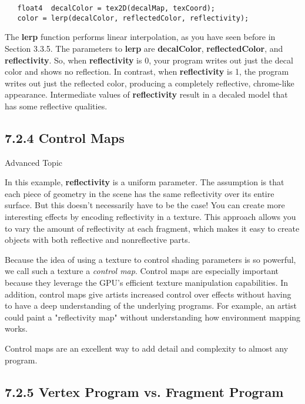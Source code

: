 \documentclass[../main.tex]{subfiles}
\begin{document}
\FloatBarrier
\begin{lstlisting}
   float4  decalColor = tex2D(decalMap, texCoord);
   color = lerp(decalColor, reflectedColor, reflectivity);
\end{lstlisting}
\FloatBarrier
   
The \textbf{lerp} function performs linear interpolation, as you have seen before in Section 3.3.5. The parameters to \textbf{lerp} are \textbf{decalColor}, \textbf{reflectedColor}, and \textbf{reflectivity}. So, when \textbf{reflectivity} is 0, your program writes out just the decal color and shows no reflection. In contrast, when \textbf{reflectivity} is 1, the program writes out just the reflected color, producing a completely reflective, chrome-like appearance. Intermediate values of \textbf{reflectivity} result in a decaled model that has some reflective qualities.

\subsection{7.2.4 Control Maps}

\begin{framed}
Advanced Topic

In this example, \textbf{reflectivity} is a uniform parameter. The assumption is that each piece of geometry in the scene has the same reflectivity over its entire surface. But this doesn't necessarily have to be the case! You can create more interesting effects by encoding reflectivity in a texture. This approach allows you to vary the amount of reflectivity at each fragment, which makes it easy to create objects with both reflective and nonreflective parts.

Because the idea of using a texture to control shading parameters is so powerful, we call such a texture a \textit{control map}. Control maps are especially important because they leverage the GPU's efficient texture manipulation capabilities. In addition, control maps give artists increased control over effects without having to have a deep understanding of the underlying programs. For example, an artist could paint a "reflectivity map" without understanding how environment mapping works.

Control maps are an excellent way to add detail and complexity to almost any program.
\end{framed}

\subsection{7.2.5 Vertex Program vs. Fragment Program}
\end{document}
